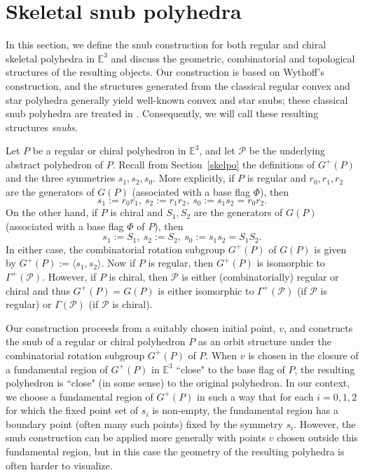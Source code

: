 \documentclass[12pt]{article}
\theoremstyle{definition}\newtheorem{definition}{Definition}[section]
\begin{document}
\section{Skeletal snub polyhedra} 
\label{snub}

In this section, we define the snub construction for both regular and chiral skeletal polyhedra in $\mathbb{E}^3$ and discuss the geometric, combinatorial and topological structures of the resulting objects.  Our construction is based on Wythoff's construction, and the structures generated from the classical regular convex and star polyhedra generally yield well-known convex and star snubs; these classical snub polyhedra are treated in \cite{11}. Consequently, we will call these resulting structures {\it snubs}.
\smallskip

Let $P$ be a regular or chiral polyhedron in $\mathbb{E}^3$, and let $\mathcal{P}$ be the underlying abstract polyhedron of $P$. Recall from Section~\ref{skelpo} the definitions of $G^+(P)$ and the three symmetries $s_1,s_2,s_0$. More explicitly, if $P$ is regular and $r_0,r_1,r_2$ are the generators of $G(P)$ (associated with a base flag $\Phi$), then
$$s_{1}:=r_{0}r_{1}, \ s_{2}:=r_{1}r_{2}, \ s_{0}:=s_{1}s_{2} = r_{0}r_{2}.$$ 
On the other hand, if $P$ is chiral and $S_1, S_2$ are the generators of $G(P)$ (associated with a base flag $\Phi$ of $P$), then 
$$s_1 := S_1, \ s_2:= S_2, \ s_0:= s_1s_2 = S_1S_2.$$ 
In either case, the combinatorial rotation subgroup $G^+(P)$ of $G(P)$ is given by 
$G^+(P):= \langle s_1, s_2 \rangle$. 
Now if $P$ is regular, then $G^+(P)$ is isomorphic to $\Gamma^+(\mathcal{P})$. However, if $P$ is chiral, then $\mathcal{P}$ is either (combinatorially) regular or chiral and thus $G^+(P)=G(P)$ is either isomorphic to $\Gamma^+(\mathcal{P})$ (if $\mathcal{P}$ is regular) or $\Gamma(\mathcal{P})$ (if $\mathcal{P}$ is chiral).  \smallskip

Our construction proceeds from a suitably chosen initial point, $v$, and constructs the snub of a regular or chiral polyhedron $P$ as an orbit structure under the combinatorial rotation subgroup $G^+(P)$ of $P$. When $v$ is chosen in the closure of a fundamental region of $G^+(P)$ in $\mathbb{E}^3$ ``close" to the base flag of $P$, the resulting polyhedron is ``close" (in some sense) to the original polyhedron. In our context, we choose a fundamental region of $G^+(P)$ in such a way that for each $i=0,1,2$ for which the fixed point set of $s_i$ is non-empty, the fundamental region has a boundary point (often many such points) fixed by the symmetry $s_i$. However, the snub construction can be applied more generally with points $v$ chosen outside this fundamental region, but in this case the geometry of the resulting polyhedra is often harder to visualize. 
\smallskip
\end{document}
